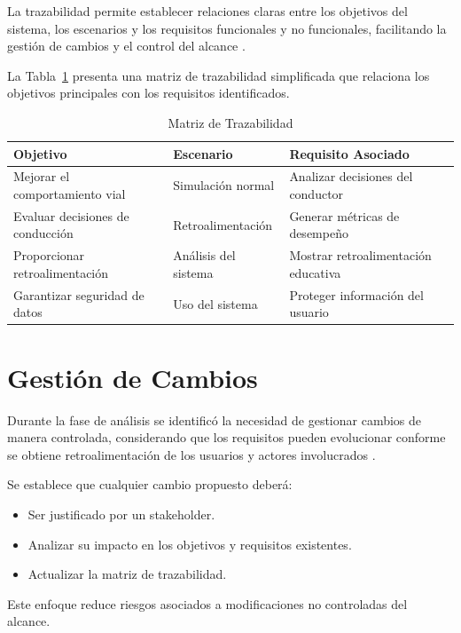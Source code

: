 \documentclass[12pt]{article}
\begin{document}
La trazabilidad permite establecer relaciones claras entre los objetivos del sistema, los escenarios y los requisitos funcionales y no funcionales, facilitando la gestión de cambios y el control del alcance \cite{Gotel1994}.

La Tabla~\ref{tab:trazabilidad} presenta una matriz de trazabilidad simplificada que relaciona los objetivos principales con los requisitos identificados.

\begin{table}[H]
\centering
\caption{Matriz de Trazabilidad}
\label{tab:trazabilidad}
\begin{tabular}{p{3cm} p{4cm} p{6cm}}
\toprule
\textbf{Objetivo} & \textbf{Escenario} & \textbf{Requisito Asociado} \\
\midrule
Mejorar el comportamiento vial & Simulación normal & Analizar decisiones del conductor \\
Evaluar decisiones de conducción & Retroalimentación & Generar métricas de desempeño \\
Proporcionar retroalimentación & Análisis del sistema & Mostrar retroalimentación educativa \\
Garantizar seguridad de datos & Uso del sistema & Proteger información del usuario \\
\bottomrule
\end{tabular}
\end{table}

\section{Gestión de Cambios}

Durante la fase de análisis se identificó la necesidad de gestionar cambios de manera controlada, considerando que los requisitos pueden evolucionar conforme se obtiene retroalimentación de los usuarios y actores involucrados \cite{Wiegers2013}.

Se establece que cualquier cambio propuesto deberá:
\begin{itemize}
    \item Ser justificado por un stakeholder.
    \item Analizar su impacto en los objetivos y requisitos existentes.
    \item Actualizar la matriz de trazabilidad.
\end{itemize}

Este enfoque reduce riesgos asociados a modificaciones no controladas del alcance.
\end{document}
